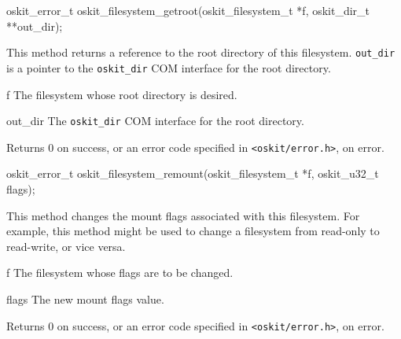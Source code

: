 \begin{apisyn}

	\funcproto oskit_error_t
	oskit_filesystem_getroot(oskit_filesystem_t *f, 
			       \outparam oskit_dir_t **out_dir);
\end{apisyn}
\ostofs
\begin{apidesc}
	This method returns a reference to the root directory of
	this filesystem.  {\tt out_dir} is a pointer to the
	{\tt oskit_dir} COM interface for the root directory.
\end{apidesc}
\begin{apiparm}
	\item[f]
		The filesystem whose root directory is desired.
	\item[out_dir]
		The {\tt oskit_dir} COM interface for the root directory.
\end{apiparm}
\begin{apiret}
	Returns 0 on success, or an error code specified in
	{\tt <oskit/error.h>}, on error.
\end{apiret}


\begin{apisyn}

	\funcproto oskit_error_t
	oskit_filesystem_remount(oskit_filesystem_t *f, 
				 oskit_u32_t flags);
\end{apisyn}
\ostofs
\begin{apidesc}
	This method changes the mount flags associated
	with this filesystem.  For example,
	this method might be used to change a filesystem
	from read-only to read-write, or vice versa.
\end{apidesc}
\begin{apiparm}
	\item[f]
		The filesystem whose flags are to be changed.
	\item[flags]
		The new mount flags value.
\end{apiparm}
\begin{apiret}
	Returns 0 on success, or an error code specified in
	{\tt <oskit/error.h>}, on error.
\end{apiret}


